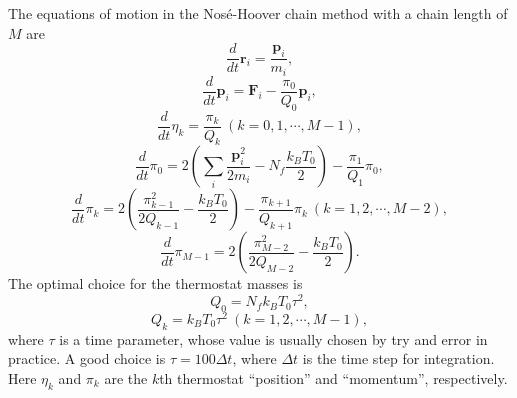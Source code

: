 \documentclass[12pt,a4paper]{report}
\newcommand{\vect}[1]{\boldsymbol{#1}}
\begin{document}
The equations of motion in the Nos\'{e}-Hoover chain method with a chain length of $M$ are
\begin{equation}
\frac{d}{dt} \vect{r}_i = \frac{\vect{p}_i}{m_i},
\end{equation}
\begin{equation}
\frac{d}{dt} \vect{p}_i = \vect{F}_i - \frac{\pi_0}{Q_0} \vect{p}_i,
\end{equation}
\begin{equation}
\frac{d}{dt} \eta_k = \frac{\pi_k}{Q_k} ~(k = 0, 1, \cdots, M-1),
\end{equation}
\begin{equation}
\frac{d}{dt} \pi_0 =
2\left(
\sum_i \frac{\vect{p}_i^2}{2m_i} - N_f\frac{k_BT_0}{2}
\right)
- \frac{\pi_1}{Q_1} \pi_0,
\end{equation}
\begin{equation}
\frac{d}{dt} \pi_k =
2\left( \frac{\pi_{k-1}^2}{2Q_{k-1}} - \frac{k_BT_0}{2} \right)
- \frac{\pi_{k+1}}{Q_{k+1}} \pi_{k} ~(k = 1, 2, \cdots, M-2),
\end{equation}
\begin{equation}
\frac{d}{dt} \pi_{M-1} =
2\left( \frac{\pi_{M-2}^2}{2Q_{M-2}} - \frac{k_BT_0}{2} \right).
\end{equation}
The optimal choice \cite{martyna1992jcp} for the thermostat masses is
\begin{equation}
Q_0 = N_f k_BT_0\tau^2,
\end{equation}
\begin{equation}
Q_k = k_BT_0\tau^2 ~(k = 1, 2, \cdots, M-1),
\end{equation}
where $\tau$ is a time parameter, whose value is usually chosen by try and error in practice. A good choice is $\tau = 100 \Delta t$, where $\Delta t$ is the time step for integration. Here $\eta_k$ and $\pi_k$ are the $k$th thermostat ``position'' and ``momentum'', respectively.
\end{document}
